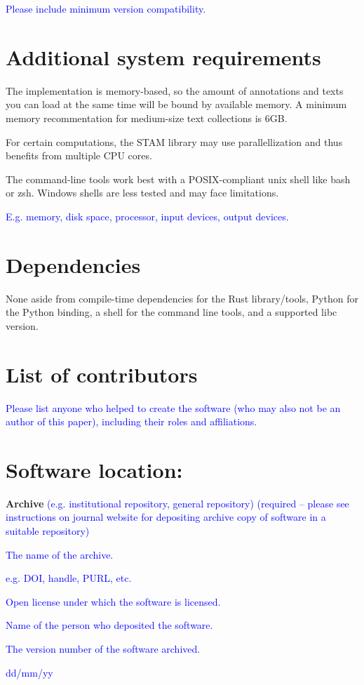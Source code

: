 \documentclass{jors}
\begin{document}
\textcolor{blue}{Please include minimum version compatibility.}

\section*{Additional system requirements}

The implementation is memory-based, so the amount of annotations and texts you can load at the same time will be bound by available memory. A minimum memory recommentation for medium-size text collections is 6GB.

For certain computations, the STAM library may use parallellization and thus benefits from multiple CPU cores.

The command-line tools work best with a POSIX-compliant unix shell like bash or zsh. Windows shells are less tested and may face limitations. 

\textcolor{blue}{E.g. memory, disk space, processor, input devices, output devices.}

\section*{Dependencies}

None aside from compile-time dependencies for the Rust library/tools, Python for the Python binding, a shell for the command line tools, and a supported libc version.

\section*{List of contributors}

\textcolor{blue}{Please list anyone who helped to create the software (who may also not be an author of this paper), including their roles and affiliations.}

\section*{Software location:}

{\bf Archive} \textcolor{blue}{(e.g. institutional repository, general repository) (required – please see instructions on journal website for depositing archive copy of software in a suitable repository)} 

\begin{description}[noitemsep,topsep=0pt]
	\item[Name:] \textcolor{blue}{The name of the archive.}
	\item[Persistent identifier:] \textcolor{blue}{e.g. DOI, handle, PURL, etc.}
	\item[Licence:] \textcolor{blue}{Open license under which the software is licensed.}
	\item[Publisher:]  \textcolor{blue}{Name of the person who deposited the software.}
	\item[Version published:] \textcolor{blue}{The version number of the software archived.}
	\item[Date published:] \textcolor{blue}{dd/mm/yy}
\end{description}
\end{document}

